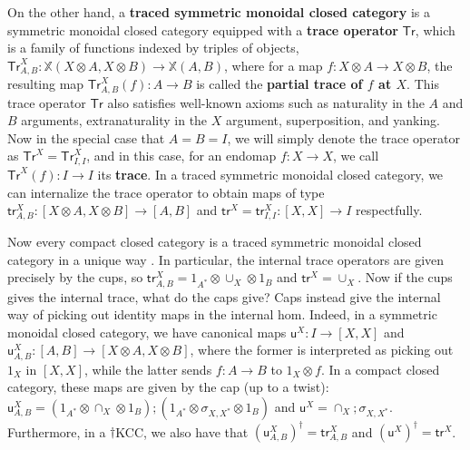 \documentclass[submission,copyright,creativecommons]{eptcs}
\begin{document}
On the other hand, a \textbf{traced symmetric monoidal closed category} \cite{hasegawa2009traced} is a symmetric monoidal closed category equipped with a \textbf{trace operator} $\mathsf{Tr}$, which is a family of functions indexed by triples of objects, $\mathsf{Tr}^X_{A,B}: \mathbb{X}(X \otimes A, X \otimes B) \to \mathbb{X}(A,B)$, where for a map $f: X \otimes A \to X \otimes B$, the resulting map $\mathsf{Tr}^X_{A,B}(f): A \to B$ is called the \textbf{partial trace of $f$ at $X$}. This trace operator $\mathsf{Tr}$ also satisfies well-known axioms \cite[Sec 5]{selinger2010survey} such as naturality in the $A$ and $B$ arguments, extranaturality in the $X$ argument, superposition, and yanking. Now in the special case that $A=B=I$, we will simply denote the trace operator as $\mathsf{Tr}^X = \mathsf{Tr}^X_{I,I}$, and in this case, for an endomap $f: X \to X$, we call $\mathsf{Tr}^X(f): I \to I$ its \textbf{trace}. In a traced symmetric monoidal closed category, we can internalize the trace operator to obtain maps of type $\mathsf{tr}^X_{A,B}: [X \otimes A, X \otimes B] \to [A,B]$ and $\mathsf{tr}^X = \mathsf{tr}^X_{I,I}: [X,X] \to I$ respectfully. 

Now every compact closed category is a traced symmetric monoidal closed category in a unique way \cite[Sec 3.2]{hasegawa2009traced}. In particular, the internal trace operators are given precisely by the cups, so $\mathsf{tr}^X_{A,B} = 1_{A^\ast} \otimes \cup_X \otimes 1_B$ and $\mathsf{tr}^X= \cup_X$. 
Now if the cups gives the internal trace, what do the caps give? Caps instead give the internal way of picking out identity maps in the internal hom. Indeed, in a symmetric monoidal closed category, we have canonical maps $\mathsf{u}^X : I \to [X,X]$ and $\mathsf{u}^X_{A,B}: [A,B] \to [X \otimes A, X \otimes B]$, where the former is interpreted as picking out $1_X$ in $[X,X]$, while the latter sends $f: A \to B$ to $1_X \otimes f$. In a compact closed category, these maps are given by the cap (up to a twist): $ \mathsf{u}^X_{A,B} =  (1_{A^\ast} \otimes \cap_X \otimes 1_B);(1_{A^\ast} \otimes \sigma_{X, X^\ast} \otimes 1_B)$ and $\mathsf{u}^X= \cap_X; \sigma_{X, X^\ast}$. 
Furthermore, in a $\dagger$KCC, we also have that $({\mathsf{u}^X_{A,B}})^\dagger = \mathsf{tr}^X_{A,B}$ and $({\mathsf{u}^X})^\dagger = \mathsf{tr}^X$. 
\end{document}

